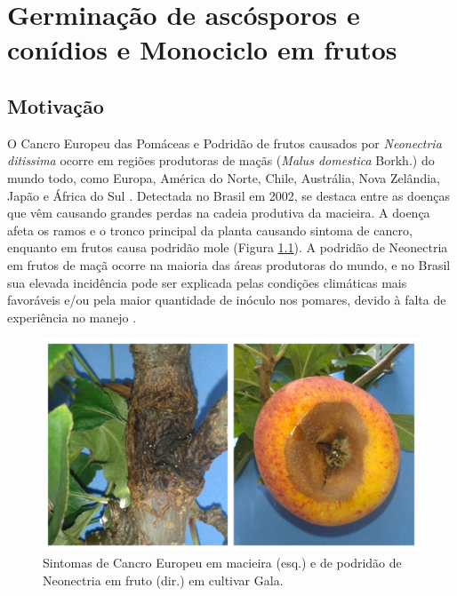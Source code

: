 \documentclass[a4paper,]{book}
\begin{document}
\chapter{Germinação de ascósporos e conídios e Monociclo em
frutos}\label{germinacao-de-ascosporos-e-conidios-e-monociclo-em-frutos}

\section{Motivação}\label{motivacao}

O Cancro Europeu das Pomáceas e Podridão de frutos causados por
\emph{Neonectria ditissima} ocorre em regiões produtoras de maçãs
(\emph{Malus domestica} Borkh.) do mundo todo, como Europa, América do
Norte, Chile, Austrália, Nova Zelândia, Japão e África do Sul
\citep{Beresford2011}. Detectada no Brasil em 2002, se destaca entre as
doenças que vêm causando grandes perdas na cadeia produtiva da macieira.
A doença afeta os ramos e o tronco principal da planta causando sintoma
de cancro, enquanto em frutos causa podridão mole (Figura
\ref{fig:prancha01}). A podridão de Neonectria em frutos de maçã ocorre
na maioria das áreas produtoras do mundo, e no Brasil sua elevada
incidência pode ser explicada pelas condições climáticas mais favoráveis
e/ou pela maior quantidade de inóculo nos pomares, devido à falta de
experiência no manejo \citep{EmbrapaCancro2015}.




\begin{figure}

{\centering \includegraphics[width=1\linewidth]{./jhulia/prancha01} 

}

\caption{Sintomas de Cancro Europeu em macieira (esq.) e de
podridão de Neonectria em fruto (dir.) em cultivar Gala.}\label{fig:prancha01}
\end{figure}
\end{document}
